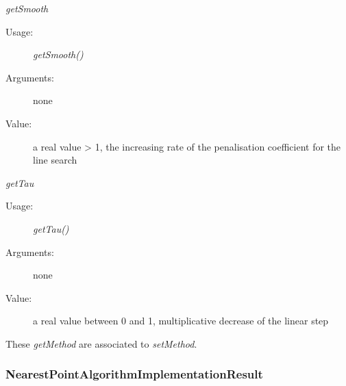 \begin{description}
\begin{description}
  \item \textit{getSmooth}
    \begin{description}
    \item[Usage:] \textit{getSmooth()}
    \item[Arguments:] none
    \item[Value:]  a real value > 1, the increasing rate of the penalisation coefficient for the line search
    \end{description}
    \bigskip

  \item \textit{getTau}
    \begin{description}
    \item[Usage:] \textit{getTau()}
    \item[Arguments:] none
    \item[Value:]  a real value between 0 and 1, multiplicative decrease of the linear step
    \end{description}
    \bigskip
  \end{description}

  These  \textit{getMethod}  are associated to  \textit{setMethod}.
\end{description}

\newpage
\subsubsection{NearestPointAlgorithmImplementationResult}


